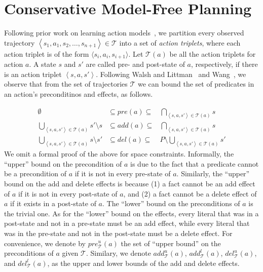 \documentclass[letterpaper]{article}
\newcommand{\tuple}[1]{\ensuremath{\left \langle #1 \right \rangle }}
\begin{document}
\section{Conservative Model-Free Planning}
Following prior work on learning action models~\cite{wang1995learning,wang1994learning,walsh2008efficientLearning}, we partition every observed trajectory $\tuple{s_1,a_1,s_2,\ldots,s_{n+1}}\in\mathcal{T}$ into a set of {\em action triplets}, where each action triplet is of the form $\langle s_i, a_i, s_{i+1}\rangle$. 
    Let $\mathcal{T}(a)$ be all the action triplets for action $a$. 
    A state $s$ and $s'$ are called pre- and post-state of $a$, respectively, if there is an action triplet $\tuple{s,a,s'}$. %
    Following Walsh and Littman~ and Wang~, we observe that from the set of trajectories $\mathcal{T}$ we can bound the set of predicates in an action's preconditinos and effects, as follows. 
    
    \begin{align}
     \emptyset & \subseteq pre(a) \subseteq & \bigcap_{\tuple{s, a, s'}\in \mathcal{T}(a)} s \\
     \bigcup_{\tuple{s, a, s'}\in \mathcal{T}(a)} s'\setminus s  & \subseteq add(a) \subseteq & \bigcap_{\tuple{s, a, s'}\in \mathcal{T}(a)} s \\
     \bigcup_{\tuple{s, a, s'}\in \mathcal{T}(a)} s\setminus s' & \subseteq del(a) \subseteq & P\setminus \bigcup_{\tuple{s, a, s'}\in \mathcal{T}(a)} s'  
     \label{eq:bounds}
    \end{align}
    We omit a formal proof of the above for space constraints. Informally, the ``upper'' bound on the precondition of $a$ is due to the fact that a predicate cannot be a precondition of $a$ if it is not in every pre-state of $a$. Similarly, the ``upper'' bound on the add and delete effects is because (1) a fact cannot be an add effect of $a$ if it is not in every post-state of $a$, and (2) a fact cannot be a delete effect of $a$ if it exists in a post-state of $a$. 
    The ``lower'' bound on the preconditions of $a$ is the trivial one. 
	As for the ``lower'' bound on the effects, every literal that was in a post-state and not in a pre-state must be an add effect, while every literal that was in the pre-state and not in the post-state must be a delete effect. 
	For convenience, we denote by $pre_\mathcal{T}^u(a)$ the set of ``upper bound'' on the preconditions of $a$ given $\mathcal{T}$. Similary, we denote $add_\mathcal{T}^u(a)$, $add_\mathcal{T}^l(a)$, $del_\mathcal{T}^u(a)$, and $del_\mathcal{T}^l(a)$, as the upper and lower bounds of the add and delete effects. 
\end{document}
